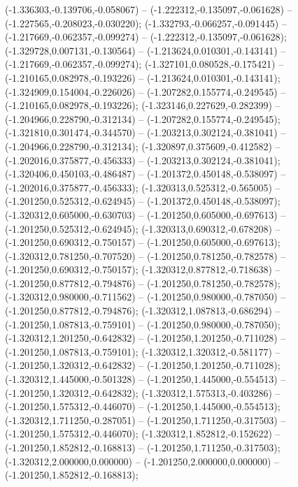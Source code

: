 (-1.336303,-0.139706,-0.058067) -- (-1.222312,-0.135097,-0.061628) -- (-1.227565,-0.208023,-0.030220);
 (-1.332793,-0.066257,-0.091445) -- (-1.217669,-0.062357,-0.099274) -- (-1.222312,-0.135097,-0.061628);
 (-1.329728,0.007131,-0.130564) -- (-1.213624,0.010301,-0.143141) -- (-1.217669,-0.062357,-0.099274);
 (-1.327101,0.080528,-0.175421) -- (-1.210165,0.082978,-0.193226) -- (-1.213624,0.010301,-0.143141);
 (-1.324909,0.154004,-0.226026) -- (-1.207282,0.155774,-0.249545) -- (-1.210165,0.082978,-0.193226);
 (-1.323146,0.227629,-0.282399) -- (-1.204966,0.228790,-0.312134) -- (-1.207282,0.155774,-0.249545);
 (-1.321810,0.301474,-0.344570) -- (-1.203213,0.302124,-0.381041) -- (-1.204966,0.228790,-0.312134);
 (-1.320897,0.375609,-0.412582) -- (-1.202016,0.375877,-0.456333) -- (-1.203213,0.302124,-0.381041);
 (-1.320406,0.450103,-0.486487) -- (-1.201372,0.450148,-0.538097) -- (-1.202016,0.375877,-0.456333);
 (-1.320313,0.525312,-0.565005) -- (-1.201250,0.525312,-0.624945) -- (-1.201372,0.450148,-0.538097);
 (-1.320312,0.605000,-0.630703) -- (-1.201250,0.605000,-0.697613) -- (-1.201250,0.525312,-0.624945);
 (-1.320313,0.690312,-0.678208) -- (-1.201250,0.690312,-0.750157) -- (-1.201250,0.605000,-0.697613);
 (-1.320312,0.781250,-0.707520) -- (-1.201250,0.781250,-0.782578) -- (-1.201250,0.690312,-0.750157);
 (-1.320312,0.877812,-0.718638) -- (-1.201250,0.877812,-0.794876) -- (-1.201250,0.781250,-0.782578);
 (-1.320312,0.980000,-0.711562) -- (-1.201250,0.980000,-0.787050) -- (-1.201250,0.877812,-0.794876);
 (-1.320312,1.087813,-0.686294) -- (-1.201250,1.087813,-0.759101) -- (-1.201250,0.980000,-0.787050);
 (-1.320312,1.201250,-0.642832) -- (-1.201250,1.201250,-0.711028) -- (-1.201250,1.087813,-0.759101);
 (-1.320312,1.320312,-0.581177) -- (-1.201250,1.320312,-0.642832) -- (-1.201250,1.201250,-0.711028);
 (-1.320312,1.445000,-0.501328) -- (-1.201250,1.445000,-0.554513) -- (-1.201250,1.320312,-0.642832);
 (-1.320312,1.575313,-0.403286) -- (-1.201250,1.575312,-0.446070) -- (-1.201250,1.445000,-0.554513);
 (-1.320312,1.711250,-0.287051) -- (-1.201250,1.711250,-0.317503) -- (-1.201250,1.575312,-0.446070);
 (-1.320312,1.852812,-0.152622) -- (-1.201250,1.852812,-0.168813) -- (-1.201250,1.711250,-0.317503);
 (-1.320312,2.000000,0.000000) -- (-1.201250,2.000000,0.000000) -- (-1.201250,1.852812,-0.168813);
